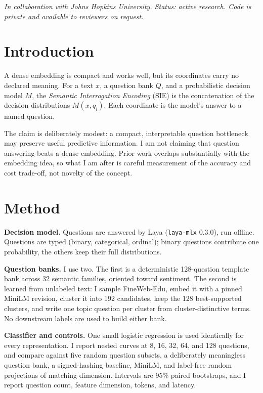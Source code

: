

\textit{In collaboration with Johns Hopkins University. Status: active research. Code is private and available to reviewers on request.}


\section{Introduction}
A dense embedding is compact and works well, but its coordinates carry no declared meaning. For a text $x$, a question bank $Q$, and a probabilistic decision model $M$, the \emph{Semantic Interrogation Encoding} (SIE) is the concatenation of the decision distributions $M(x,q_i)$. Each coordinate is the model's answer to a named question.

The claim is deliberately modest: a compact, interpretable question bottleneck may preserve useful predictive information. I am not claiming that question answering beats a dense embedding. Prior work overlaps substantially with the embedding idea, so what I am after is careful measurement of the accuracy and cost trade-off, not novelty of the concept.

\section{Method}
\textbf{Decision model.} Questions are answered by Laya (\texttt{laya-mlx} 0.3.0), run offline. Questions are typed (binary, categorical, ordinal); binary questions contribute one probability, the others keep their full distributions.

\textbf{Question banks.} I use two. The first is a deterministic 128-question template bank across 32 semantic families, oriented toward sentiment. The second is learned from unlabeled text: I sample FineWeb-Edu, embed it with a pinned MiniLM revision, cluster it into 192 candidates, keep the 128 best-supported clusters, and write one topic question per cluster from cluster-distinctive terms. No downstream labels are used to build either bank.

\textbf{Classifier and controls.} One small logistic regression is used identically for every representation. I report nested curves at 8, 16, 32, 64, and 128 questions, and compare against five random question subsets, a deliberately meaningless question bank, a signed-hashing baseline, MiniLM, and label-free random projections of matching dimension. Intervals are 95\% paired bootstraps, and I report question count, feature dimension, tokens, and latency.

